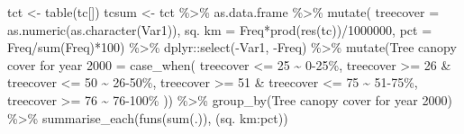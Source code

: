 \documentclass[10pt,landscape,a3paper]{article}
\newenvironment{Shaded}{\begin{snugshade}}{\end{snugshade}}
\newcommand{\AttributeTok}[1]{\textcolor[rgb]{0.77,0.63,0.00}{#1}}
\newcommand{\DecValTok}[1]{\textcolor[rgb]{0.00,0.00,0.81}{#1}}
\newcommand{\FunctionTok}[1]{\textcolor[rgb]{0.00,0.00,0.00}{#1}}
\newcommand{\NormalTok}[1]{#1}
\newcommand{\OtherTok}[1]{\textcolor[rgb]{0.56,0.35,0.01}{#1}}
\newcommand{\SpecialCharTok}[1]{\textcolor[rgb]{0.00,0.00,0.00}{#1}}
\newcommand{\StringTok}[1]{\textcolor[rgb]{0.31,0.60,0.02}{#1}}
\begin{document}
\begin{Shaded}
\begin{Highlighting}[]
\NormalTok{tct }\OtherTok{\textless{}{-}} \FunctionTok{table}\NormalTok{(tc[])}
\NormalTok{tcsum }\OtherTok{\textless{}{-}}\NormalTok{ tct }\SpecialCharTok{\%\textgreater{}\%}\NormalTok{ as.data.frame }\SpecialCharTok{\%\textgreater{}\%}
  \FunctionTok{mutate}\NormalTok{(}
    \AttributeTok{treecover =} \FunctionTok{as.numeric}\NormalTok{(}\FunctionTok{as.character}\NormalTok{(Var1)),}
    \StringTok{\textasciigrave{}}\AttributeTok{sq. km}\StringTok{\textasciigrave{}} \OtherTok{=}\NormalTok{ Freq}\SpecialCharTok{*}\FunctionTok{prod}\NormalTok{(}\FunctionTok{res}\NormalTok{(tc))}\SpecialCharTok{/}\DecValTok{1000000}\NormalTok{,}
    \AttributeTok{pct =}\NormalTok{ Freq}\SpecialCharTok{/}\FunctionTok{sum}\NormalTok{(Freq)}\SpecialCharTok{*}\DecValTok{100}\NormalTok{) }\SpecialCharTok{\%\textgreater{}\%}
\NormalTok{  dplyr}\SpecialCharTok{::}\FunctionTok{select}\NormalTok{(}\SpecialCharTok{{-}}\NormalTok{Var1, }\SpecialCharTok{{-}}\NormalTok{Freq) }\SpecialCharTok{\%\textgreater{}\%} 
  \FunctionTok{mutate}\NormalTok{(}\StringTok{\textasciigrave{}}\AttributeTok{Tree canopy cover for year 2000}\StringTok{\textasciigrave{}} \OtherTok{=} \FunctionTok{case\_when}\NormalTok{(}
\NormalTok{    treecover }\SpecialCharTok{\textless{}=} \DecValTok{25} \SpecialCharTok{\textasciitilde{}} \StringTok{\textquotesingle{}0{-}25\%\textquotesingle{}}\NormalTok{,}
\NormalTok{    treecover }\SpecialCharTok{\textgreater{}=} \DecValTok{26} \SpecialCharTok{\&}\NormalTok{ treecover }\SpecialCharTok{\textless{}=} \DecValTok{50} \SpecialCharTok{\textasciitilde{}} \StringTok{\textquotesingle{}26{-}50\%\textquotesingle{}}\NormalTok{,}
\NormalTok{    treecover }\SpecialCharTok{\textgreater{}=} \DecValTok{51} \SpecialCharTok{\&}\NormalTok{ treecover }\SpecialCharTok{\textless{}=} \DecValTok{75} \SpecialCharTok{\textasciitilde{}} \StringTok{\textquotesingle{}51{-}75\%\textquotesingle{}}\NormalTok{,}
\NormalTok{    treecover }\SpecialCharTok{\textgreater{}=} \DecValTok{76} \SpecialCharTok{\textasciitilde{}} \StringTok{\textquotesingle{}76{-}100\%\textquotesingle{}}
\NormalTok{  )) }\SpecialCharTok{\%\textgreater{}\%}
  \FunctionTok{group\_by}\NormalTok{(}\StringTok{\textasciigrave{}}\AttributeTok{Tree canopy cover for year 2000}\StringTok{\textasciigrave{}}\NormalTok{) }\SpecialCharTok{\%\textgreater{}\%}
  \FunctionTok{summarise\_each}\NormalTok{(}\FunctionTok{funs}\NormalTok{(}\FunctionTok{sum}\NormalTok{(.)), (}\StringTok{\textasciigrave{}}\AttributeTok{sq. km}\StringTok{\textasciigrave{}}\SpecialCharTok{:}\NormalTok{pct))}

\end{Highlighting}
\end{Shaded}
\end{document}
